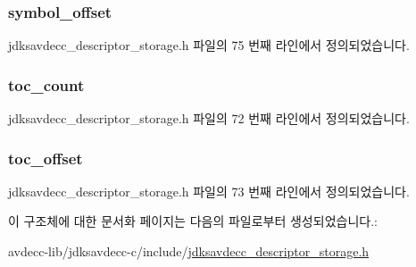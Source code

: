 \subsubsection[{\texorpdfstring{symbol\+\_\+offset}{symbol_offset}}]{ symbol\+\_\+offset}\hypertarget{structjdksavdecc__descriptor__storage__header_a8c57a9eff61cd27a604d84ff1c777e61}{}\label{structjdksavdecc__descriptor__storage__header_a8c57a9eff61cd27a604d84ff1c777e61}


jdksavdecc\+\_\+descriptor\+\_\+storage.\+h 파일의 75 번째 라인에서 정의되었습니다.

\subsubsection[{\texorpdfstring{toc\+\_\+count}{toc_count}}]{ toc\+\_\+count}\hypertarget{structjdksavdecc__descriptor__storage__header_a22c14d132b1eabf9f84417876ad8022b}{}\label{structjdksavdecc__descriptor__storage__header_a22c14d132b1eabf9f84417876ad8022b}


jdksavdecc\+\_\+descriptor\+\_\+storage.\+h 파일의 72 번째 라인에서 정의되었습니다.

\subsubsection[{\texorpdfstring{toc\+\_\+offset}{toc_offset}}]{ toc\+\_\+offset}\hypertarget{structjdksavdecc__descriptor__storage__header_a633a6afa4bfb208d943ddadb31e983ad}{}\label{structjdksavdecc__descriptor__storage__header_a633a6afa4bfb208d943ddadb31e983ad}


jdksavdecc\+\_\+descriptor\+\_\+storage.\+h 파일의 73 번째 라인에서 정의되었습니다.



이 구조체에 대한 문서화 페이지는 다음의 파일로부터 생성되었습니다.\+:\begin{DoxyCompactItemize}
\item 
avdecc-\/lib/jdksavdecc-\/c/include/\hyperlink{jdksavdecc__descriptor__storage_8h}{jdksavdecc\+\_\+descriptor\+\_\+storage.\+h}\end{DoxyCompactItemize}
